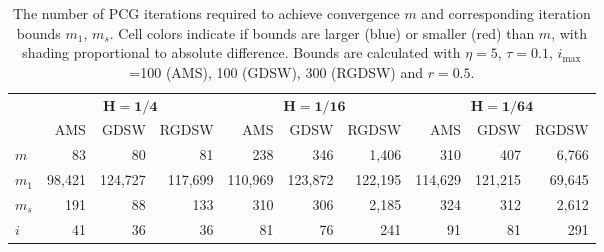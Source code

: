 \begin{table}[H]
\centering
\caption{The number of PCG iterations required to achieve convergence $m$ and corresponding iteration bounds $m_1$, $m_s$. Cell colors indicate if bounds are larger (blue) or smaller (red) than $m$, with shading proportional to absolute difference. Bounds are calculated with $\eta=5$, $\tau=0.1$, $i_{\max}$=100 (AMS), 100 (GDSW), 300 (RGDSW) and $r=0.5$.}
\label{tab:cg_iteration_bounds}
\begin{tabular}{lrrrrrrrrr}
\toprule
 & \multicolumn{3}{c}{$\mathbf{H=1/4}$} & \multicolumn{3}{c}{$\mathbf{H=1/16}$} & \multicolumn{3}{c}{$\mathbf{H=1/64}$} \\
 & AMS & GDSW & RGDSW & AMS & GDSW & RGDSW & AMS & GDSW & RGDSW \\
\midrule
$m$ & 83 & 80 & 81 & 238 & 346 & 1,406 & 310 & 407 & 6,766 \\
\cline{1-10}
$m_1$ & {\cellcolor[HTML]{AFC9F6}} \color[HTML]{000000} 98,421 & {\cellcolor[HTML]{AFC9F6}} \color[HTML]{000000} 124,727 & {\cellcolor[HTML]{AFC9F6}} \color[HTML]{000000} 117,699 & {\cellcolor[HTML]{AFC9F6}} \color[HTML]{000000} 110,969 & {\cellcolor[HTML]{7EAFF1}} \color[HTML]{000000} 123,872 & {\cellcolor[HTML]{AFC9F6}} \color[HTML]{000000} 122,195 & {\cellcolor[HTML]{AFC9F6}} \color[HTML]{000000} 114,629 & {\cellcolor[HTML]{7EAFF1}} \color[HTML]{000000} 121,215 & {\cellcolor[HTML]{7EAFF1}} \color[HTML]{000000} 69,645 \\
\cline{1-10}
$m_s$ & {\cellcolor[HTML]{7EAFF1}} \color[HTML]{000000} 191 & {\cellcolor[HTML]{7EAFF1}} \color[HTML]{000000} 88 & {\cellcolor[HTML]{7EAFF1}} \color[HTML]{000000} 133 & {\cellcolor[HTML]{7EAFF1}} \color[HTML]{000000} 310 & {\cellcolor[HTML]{945357}} \color[HTML]{F1F1F1} 306 & {\cellcolor[HTML]{7EAFF1}} \color[HTML]{000000} 2,185 & {\cellcolor[HTML]{7EAFF1}} \color[HTML]{000000} 324 & {\cellcolor[HTML]{945357}} \color[HTML]{F1F1F1} 312 & {\cellcolor[HTML]{945357}} \color[HTML]{F1F1F1} 2,612 \\
\cline{1-10}
$i$ & 41 & 36 & 36 & 81 & 76 & 241 & 91 & 81 & 291 \\
\cline{1-10}
\bottomrule
\end{tabular}
\end{table}
